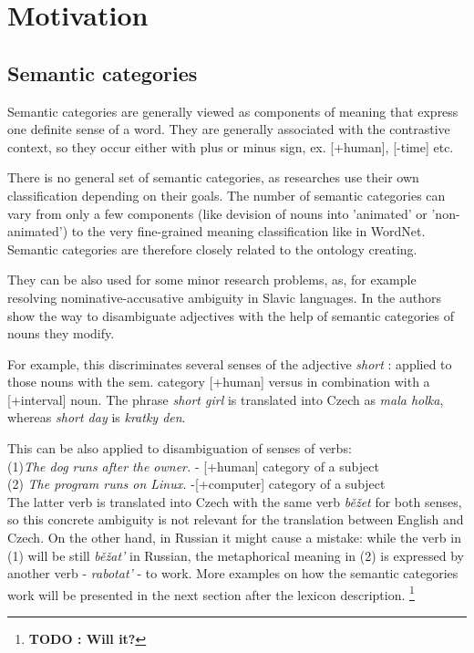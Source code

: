 \documentclass[letterpaper]{article}
\newcommand{\todofn}[1] {
 \footnote{\textbf{TODO : #1}}}
\begin{document}
\section{Motivation}
\subsection{Semantic categories}
Semantic categories are generally viewed as components of meaning
that express one definite sense of a word. They are generally associated
with the contrastive context, so they occur either with plus or minus
sign, ex. [+human], [-time] etc.

There is no general set of semantic categories, as researches
use their own classification depending on their goals. The
number of semantic categories can vary from only a few components (like
devision of nouns into 'animated' or 'non-animated') to the very
fine-grained meaning classification like in WordNet. Semantic categories 
are therefore closely related to the ontology creating.

They can be also used for some minor research problems, as, for example
resolving nominative-accusative ambiguity in Slavic languages.
In \cite{principled_disam} the authors show the way to disambiguate adjectives
with the help of semantic categories of nouns they modify. 

For example, 
this discriminates several senses of the  adjective \textit{short}
: applied to those nouns with the sem. category [+human] versus in combination
with a [+interval] noun. The phrase \textit{short girl} is translated
into Czech as \textit{mala holka}, whereas \textit{short day} is \textit{kratky den}.

This can be also applied to disambiguation of senses of verbs:\\ 
(1)\textit{The dog runs after the owner.} - [+human] category of a subject\\
(2) \textit{The program runs on Linux.} -[+computer] category of a subject \\
The latter verb is translated into Czech with the same verb \textit{běžet}
for both senses, so this concrete ambiguity is not relevant for
the translation between English and Czech. On the other hand, in Russian
it might cause a mistake: while the verb in (1) will be still \textit{běžat'} in Russian,
the metaphorical meaning in (2) is expressed by another verb - \textit{rabotat'} - to work.
More examples on how the semantic categories work will be presented in the next section
after the lexicon description. \todofn{Will it?}
\end{document}
